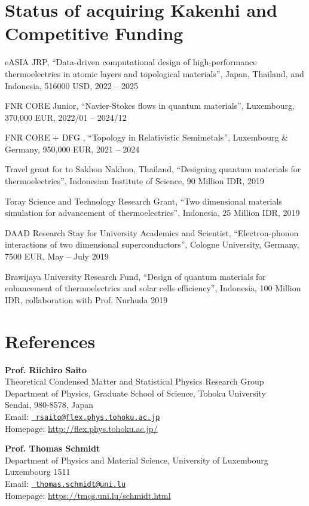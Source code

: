 \documentclass[a4paper,11pt]{article}
\renewenvironment{itemize}{
  \begin{list}{}{
      \setlength{\leftmargin}{1.5em}
      \setlength{\parskip}{0pt}
      \setlength{\parsep}{0pt}
      \setlength{\itemsep}{3pt}
  }
}{
  \end{list}
}
\begin{document}
\section{Status of acquiring Kakenhi and Competitive Funding}
\begin {itemize}
\item eASIA JRP, ``Data-driven computational design of high-performance thermoelectrics in atomic layers and topological materials'', Japan, Thailand, and Indonesia, 516000 USD, 2022 -- 2025
\item  FNR CORE Junior, ``Navier-Stokes flows in quantum materials'', Luxembourg, 370,000 EUR, 2022/01 -- 2024/12
\item FNR CORE + DFG , ``Topology in Relativistic Semimetals'', Luxembourg \& Germany, 950,000 EUR, 2021 -- 2024
  \item Travel grant for  to Sakhon Nakhon, Thailand, ``Designing quantum materials for thermoelectrics'', Indonesian Institute of Science, 90 Million IDR, 2019
 \item  Toray Science and Technology Research Grant, ``Two dimensional materials simulation for advancement of thermoelectrics'', Indonesia, 25 Million IDR, 2019
 \item  DAAD Research Stay for University Academics and Scientist, ``Electron-phonon interactions of two dimensional superconductors'', Cologne University, Germany, 7500 EUR, May -- July 2019
 \item Brawijaya University Research Fund, ``Design of quantum materials for enhancement of thermoelectrics and solar cells efficiency'', Indonesia, 100 Million IDR, collaboration with Prof. Nurhuda 2019
\end{itemize}


\vspace*{\baselineskip}
\section*{References}

\begin{itemize}

\item {\bf Prof. Riichiro Saito}\\
  Theoretical Condensed Matter and
  Statistical Physics Research Group\\
  Department of Physics, Graduate
  School of Science, Tohoku University\\
  Sendai, 980-8578, Japan\\
  Email: \href{mailto:rsaito@flex.phys.tohoku.ac.jp}{\tt
    rsaito@flex.phys.tohoku.ac.jp} \\
  Homepage:
  \href{http://flex.phys.tohoku.ac.jp/}{\url{http://flex.phys.tohoku.ac.jp/}}
\item {\bf Prof. Thomas Schmidt}\\
  Department of Physics and Material Science, 
  University of Luxembourg\\
  Luxembourg 1511\\
  Email: \href{mailto:thomas.schmidt@uni.lu}{\tt
    thomas.schmidt@uni.lu} \\
  Homepage:
  \href{https://tmqs.uni.lu/schmidt.html}{\url{https://tmqs.uni.lu/schmidt.html}}
\end{itemize}
\end{document}
